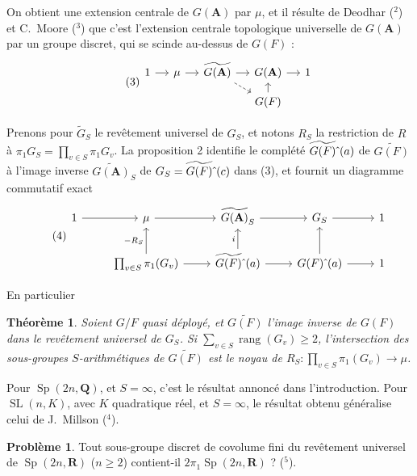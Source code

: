 \documentclass[11pt]{amsart}
\theoremstyle{plain}
\newtheorem{theoreme}{Th\'eor\`eme}
\theoremstyle{definition}
\newtheorem{probleme}{Probl\`eme}
\DeclareMathOperator{\rang}{rang}
\DeclareMathOperator{\Sp}{Sp}
\DeclareMathOperator{\SL}{SL}
\begin{document}
On obtient une extension centrale de $G(\mathbf{A})$ par $\mu$, et il r\'esulte de Deodhar ($^2$) et C.\ Moore ($^3$) que c'est l'extension centrale topologique universelle de $G(\mathbf{A})$ par un groupe discret, qui se scinde au-dessus de $G(F)$ :
\begin{equation}\tag{3}
\begin{tikzcd}[column sep=small, row sep=small]
1 \arrow[r] & \mu \arrow[r] & \widetilde{G(\mathbf{A})} \arrow[r] \arrow[dr, dashrightarrow] & G(\mathbf{A}) \arrow[r] & 1 \\ 
& & & G(F) \arrow[u] &
\end{tikzcd}
\end{equation}

Prenons pour $\widetilde{G}_S$ le rev\^etement universel de $G_S$, et notons $R_S$ la restriction de $R$ \`a $\pi_1 G_S=\prod_{v\in S}\pi_1 G_v$. La proposition 2 identifie le compl\'et\'e $\widetilde{G(F)}\hat{\mkern6mu}(a)$ de $\widetilde{G(F)}$ \`a l'image inverse $\widetilde{G(\mathbf{A})}_S$ de $G_S=\widetilde{G(F)}\hat{\mkern6mu}(c)$ dans (3), et fournit un diagramme commutatif exact
\begin{equation}\tag{4}
\begin{tikzcd}
1 \arrow[r] & \mu \arrow[r] & \widetilde{G(\mathbf{A})}_S \arrow[r] & G_S \arrow[r] & 1 \\
& \prod_{v\in S}\pi_1(G_v) \arrow[u, "-R_S"] \arrow[r] & \widetilde{G(F)}\hat{\mkern6mu}(a) \arrow[u, "i"] \arrow[r] & G(F)\hat{\mkern6mu}(a) \arrow[u] \arrow[r] & 1
\end{tikzcd}
\end{equation}

En particulier

\begin{theoreme}
Soient $G/F$ quasi d\'eploy\'e, et $\widetilde{G(F)}$ l'image inverse de $G(F)$ dans le rev\^etement universel de $G_S$. Si $\sum_{v\in S}\rang(G_v)\ge 2$, l'intersection des sous-groupes $S$-arithm\'etiques de $\widetilde{G(F)}$ est le noyau de $R_S:\prod_{v\in S}\pi_1(G_v)\to\mu$.
\end{theoreme}

Pour $\Sp(2n,\mathbf{Q})$, et $S=\infty$, c'est le r\'esultat annonc\'e dans l'introduction. Pour $\SL(n,K)$, avec $K$ quadratique r\'eel, et $S=\infty$, le r\'esultat obtenu g\'en\'eralise celui de J.\ Millson ($^4$).

\begin{probleme}
Tout sous-groupe discret de covolume fini du rev\^etement universel de $\Sp(2n,\mathbf{R})$ ($n\ge 2$) contient-il $2\pi_1\Sp(2n,\mathbf{R})$ ? ($^5$).
\end{probleme}
\end{document}
